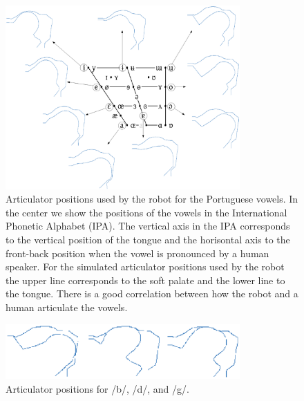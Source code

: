 \begin{figure}
\centering
\includegraphics[width=0.8\textwidth]{include/babbling/images/vowels.eps}
\caption{Articulator positions used by the robot for the
  Portuguese vowels. In the center we show the positions of the vowels
  in the International Phonetic Alphabet (IPA). The vertical axis in
  the IPA corresponds to the vertical position of the tongue and the
  horisontal axis to the front-back position when the vowel is
  pronounced by a human speaker. For the simulated articulator
  positions used by the robot the upper line corresponds to the soft
  palate and the lower line to the tongue. There is a good correlation
  between how the robot and a human articulate the vowels.}
\label{fig:babbling:positions}
\end{figure}

\begin{figure}
\centering
\includegraphics[width=0.8\textwidth]{include/babbling/images/cardinal.eps}
\caption{Articulator positions for /b/, /d/, and /g/.}
\label{fig:babbling:cardinal}
\end{figure}


\endinput
